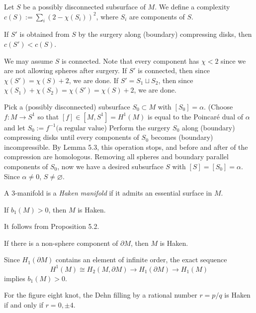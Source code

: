 \documentclass{../../../small}
\begin{document}
Let $S$ be a possibly disconnected subsurface of $M$.
We define a complexity $c(S):=\sum_i(2-\chi(S_i))^2$, where $S_i$ are components of $S$.

\begin{lem}
If $S'$ is obtained from $S$ by the surgery along (boundary) compressing disks, then $c(S')<c(S)$.
\end{lem}
\begin{pf}
We may assume $S$ is connected.
Note that every component has $\chi<2$ since we are not allowing spheres after surgery.
If $S'$ is connected, then since $\chi(S')=\chi(S)+2$, we are done.
If $S'=S_1\sqcup S_2$, then since $\chi(S_1)+\chi(S_2)=\chi(S')=\chi(S)+2$, we are done.
\end{pf}

\begin{pf}
Pick a (possibly disconnected) subsurface $S_0\subset M$ with $[S_0]=\alpha$.
(Choose $f:M\to S^1$ so that $[f]\in[M,S^1]=H^1(M)$ is equal to the Poincar\'e dual of $\alpha$ and let $S_0:=f^{-1}(\text{a regular value}$)
Perform the surgery $S_0$ along (boundary) compressing disks until every components of $S_0$ becomes (boundary) incompressible.
By Lemma 5.3, this operation stops, and before and after of the compression are homologous.
Removing all spheres and boundary parallel components of $S_0$, now we have a desired subsurface $S$ with $[S]=[S_0]=\alpha$.
Since $\alpha\ne0$, $S\ne\varnothing$.
\end{pf}


A 3-manifold is a \emph{Haken manifold} if it admits an essential surface in $M$.

\begin{cor}
If $b_1(M)>0$, then $M$ is Haken.
\end{cor}
\begin{pf}
It follows from Proposition 5.2.
\end{pf}
\begin{cor}
If there is a non-sphere component of $\partial M$, then $M$ is Haken.
\end{cor}
\begin{pf}
Since $H_1(\partial M)$ contains an element of infinite order, the exact sequence
\[H^1(M)\cong H_2(M,\partial M)\to H_1(\partial M)\to H_1(M)\]
implies $b_1(M)>0$.
\end{pf}


\begin{thm}[Thurston]
For the figure eight knot, the Dehn filling by a rational number $r=p/q$ is Haken if and only if $r=0,\pm4$.
\end{thm}
\end{document}
